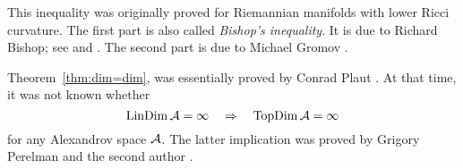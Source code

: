 This inequality was originally proved for Riemannian manifolds with lower Ricci curvature.
The first part is also called \emph{Bishop's inequality}.
It is due to Richard Bishop; see \cite{bishop1964} and \cite[Corollary 4, p. 256]{bishop-crittenden}.
The second part is due to Michael Gromov \cite{gromov1981}.

Theorem~\ref{thm:dim=dim}, was essentially proved by Conrad Plaut \cite{plaut:dimension}.
At that time, it was not known whether
\[\mathop{\rm LinDim}\nolimits\mathcal{A}=\infty\quad \Rightarrow\quad \mathop{\rm TopDim}\nolimits\mathcal{A}=\infty\]
for any Alexandrov space $\mathcal{A}$.
The latter implication was proved by Grigory Perelman and the second author \cite{perelman-petrunin:qg}.

